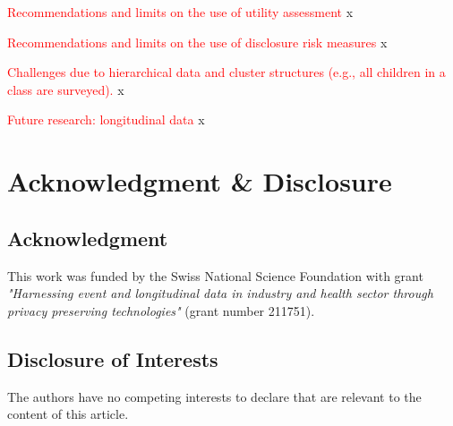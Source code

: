 \documentclass{article}
\begin{document}
\textcolor{red}{Recommendations and limits on the use of utility assessment}
x

\textcolor{red}{Recommendations and limits on the use of disclosure risk measures}
x

\textcolor{red}{Challenges due to hierarchical data and cluster structures (e.g., all children in a class are surveyed).}
x

\textcolor{red}{Future research: longitudinal data}
x

\section*{Acknowledgment \& Disclosure} 
\subsection*{Acknowledgment} 
This work was funded by the Swiss National Science Foundation with grant \textit{"Harnessing event and longitudinal data in industry and health sector through privacy preserving technologies"} (grant number 211751).

\subsection*{Disclosure of Interests} 
The authors have no competing interests to declare that are relevant to the content of this article. 




\end{document}
